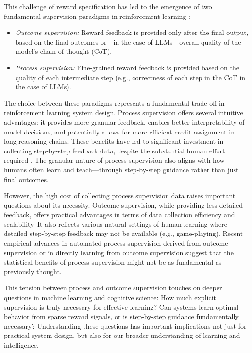 \documentclass{article}
\begin{document}
This challenge of reward specification has led to the emergence of two fundamental supervision paradigms in reinforcement learning \citep[e.g.,][]{uesato2022solving,lightman2023let}:
\begin{itemize}
    \item \emph{Outcome supervision:} Reward feedback is provided only after the final output, based on the final outcomes or---in the case of LLMs---overall quality of the model's chain-of-thought (CoT).
    \item \emph{Process supervision:} Fine-grained reward feedback is provided based on the quality of each intermediate step (e.g., correctness of each step in the CoT in the case of LLMs).
\end{itemize}

The choice between these paradigms represents a fundamental trade-off in reinforcement learning system design. Process supervision offers several intuitive advantages: it provides more granular feedback, enables better interpretability of model decisions, and potentially allows for more efficient credit assignment in long reasoning chains. These benefits have led to significant investment in collecting step-by-step feedback data, despite the substantial human effort required \citep{lightman2023let}. The granular nature of process supervision also aligns with how humans often learn and teach—through step-by-step guidance rather than just final outcomes.

However, the high cost of collecting process supervision data raises important questions about its necessity. Outcome supervision, while providing less detailed feedback, offers practical advantages in terms of data collection efficiency and scalability. It also reflects various natural settings of human learning where detailed step-by-step feedback may not be available (e.g., game-playing). Recent empirical advances in automated process supervision derived from outcome supervision \citep{wang2024math,luo2024improve,zhong2024dpo,yuan2024free,setlur2024rewarding} or in directly learning from outcome supervision \citep{guo2025deepseek} suggest that the statistical benefits of process supervision might not be as fundamental as previously thought.

This tension between process and outcome supervision touches on deeper questions in machine learning and cognitive science: How much explicit supervision is truly necessary for effective learning? Can systems learn optimal behavior from sparse reward signals, or is step-by-step guidance fundamentally necessary? Understanding these questions has important implications not just for practical system design, but also for our broader understanding of learning and intelligence.
\end{document}

